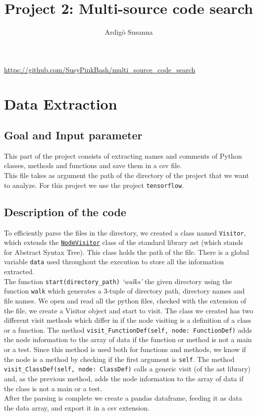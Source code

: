 \documentclass [14 pt]{article}
\title{Project 2: Multi-source code search}
\author{Ardig\`o Susanna}
\begin{document}
\pagestyle{fancy}
\fancyhf{}
\cfoot{\thepage}

\begin{titlingpage}
\maketitle
\centering
\url{https://github.com/SusyPinkBash/multi_source_code_search}
\end{titlingpage}

\newpage\thispagestyle{plain}
\tableofcontents
\newpage

\section{Data Extraction} %
\subsection{Goal and Input parameter} %
This part of the project consists of extracting names and comments of Python classes, methods and functions and save them in a csv file.\\
This file takes as argument the path of the directory of the project that we want to analyze. For this project we use the project \texttt{tensorflow}.

\subsection{Description of the code} %
To efficiently parse the files in the directory, we created a class named \texttt{Visitor}, which extends the \href{https://docs.python.org/3/library/ast.html#ast.NodeVisitor}{\texttt{NodeVisitor}} class of the standard library ast (which stands for Abstract Syntax Tree). This class holds the path of the file. There is a global variable \texttt{data} used throughout the execution to store all the information extracted.\\
The function \texttt{start(directory\_path)} \emph{`walks'} the given directory using the function \texttt{walk} which generates a 3-tuple of directory path, directory names and file names. We open and read all the python files, checked with the extension of the file, we create a Visitor object and start to visit. The class we created has two different visit methods which differ in if the node visiting is a definition of a class or a function.
The method \texttt{visit\_FunctionDef(self, node: FunctionDef)} adds the node information to the array of data if the function or method is not a main or a test. Since this method is used both for functions and methods, we know if the node is a method by checking if the first argument is \texttt{self}.
The method \texttt{visit\_ClassDef(self, node: ClassDef)} calls a generic visit (of the ast library) and, as the previous method, adds the node information to the array of data if the class is not a main or a test. \\
After the parsing is complete we create a pandas dataframe, feeding it as data the data array, and export it in a csv extension.
\end{document}
